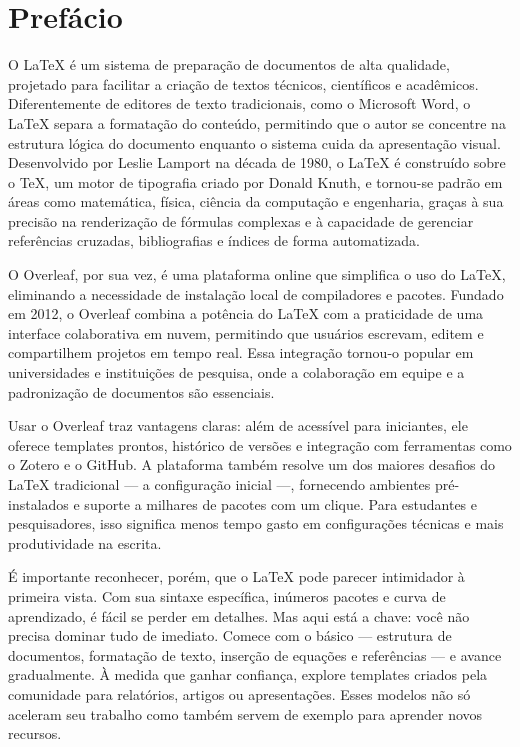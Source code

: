 \pagestyle{empty} %

\chapter*{Prefácio}
\justify
{}

O LaTeX é um sistema de preparação de documentos de alta qualidade, projetado para facilitar a criação de textos técnicos, científicos e acadêmicos. Diferentemente de editores de texto tradicionais, como o Microsoft Word, o LaTeX separa a formatação do conteúdo, permitindo que o autor se concentre na estrutura lógica do documento enquanto o sistema cuida da apresentação visual. Desenvolvido por Leslie Lamport na década de 1980, o LaTeX é construído sobre o TeX, um motor de tipografia criado por Donald Knuth, e tornou-se padrão em áreas como matemática, física, ciência da computação e engenharia, graças à sua precisão na renderização de fórmulas complexas e à capacidade de gerenciar referências cruzadas, bibliografias e índices de forma automatizada.

O Overleaf, por sua vez, é uma plataforma online que simplifica o uso do LaTeX, eliminando a necessidade de instalação local de compiladores e pacotes. Fundado em 2012, o Overleaf combina a potência do LaTeX com a praticidade de uma interface colaborativa em nuvem, permitindo que usuários escrevam, editem e compartilhem projetos em tempo real. Essa integração tornou-o popular em universidades e instituições de pesquisa, onde a colaboração em equipe e a padronização de documentos são essenciais.

Usar o Overleaf traz vantagens claras: além de acessível para iniciantes, ele oferece templates prontos, histórico de versões e integração com ferramentas como o Zotero e o GitHub. A plataforma também resolve um dos maiores desafios do LaTeX tradicional — a configuração inicial —, fornecendo ambientes pré-instalados e suporte a milhares de pacotes com um clique. Para estudantes e pesquisadores, isso significa menos tempo gasto em configurações técnicas e mais produtividade na escrita.

É importante reconhecer, porém, que o LaTeX pode parecer intimidador à primeira vista. Com sua sintaxe específica, inúmeros pacotes e curva de aprendizado, é fácil se perder em detalhes. Mas aqui está a chave: você não precisa dominar tudo de imediato. Comece com o básico — estrutura de documentos, formatação de texto, inserção de equações e referências — e avance gradualmente. À medida que ganhar confiança, explore templates criados pela comunidade para relatórios, artigos ou apresentações. Esses modelos não só aceleram seu trabalho como também servem de exemplo para aprender novos recursos.

